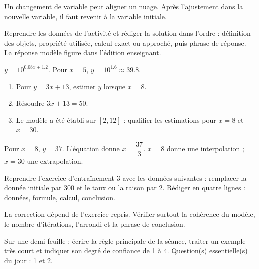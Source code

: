 \begin{summary}Un changement de variable peut aligner un nuage. Après l'ajustement dans la nouvelle variable, il faut revenir à la variable initiale.\end{summary}

\begin{example}
Reprendre les données de l'activité et rédiger la solution dans l'ordre : définition des objets, propriété utilisée, calcul exact ou approché, puis phrase de réponse. La réponse modèle figure dans l'édition enseignant.
\end{example}
\begin{solution}$y=10^{\num{0,08}x+\num{1,2}}$. Pour $x=5$, $y=10^{\num{1,6}}\approx\num{39,8}$.\end{solution}

\begin{exercise}[essentiel]
\begin{enumerate}\item Pour $y=3x+13$, estimer $y$ lorsque $x=8$.\item Résoudre $3x+13=50$.\item Le modèle a été établi sur $[2,12]$ : qualifier les estimations pour $x=8$ et $x=30$.\end{enumerate}
\end{exercise}
\begin{solution}Pour $x=8$, $y=37$. L'équation donne $x=\dfrac{37}{3}$. $x=8$ donne une interpolation ; $x=30$ une extrapolation.\end{solution}


\begin{homework}Reprendre l'exercice d'entraînement 3 avec les données suivantes : remplacer la donnée initiale par $300$ et le taux ou la raison par $2$. Rédiger en quatre lignes : données, formule, calcul, conclusion.\end{homework}
\begin{solution}La correction dépend de l'exercice repris. Vérifier surtout la cohérence du modèle, le nombre d'itérations, l'arrondi et la phrase de conclusion.\end{solution}

\begin{exitticket}[3 minutes]Sur une demi-feuille : écrire la règle principale de la séance, traiter un exemple très court et indiquer son degré de confiance de 1 à 4. Question(s) essentielle(s) du jour : 1 et 2.\end{exitticket}

